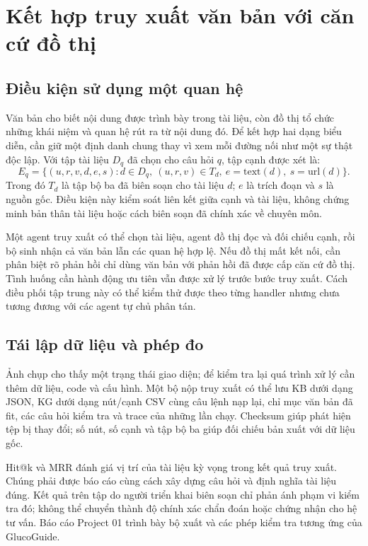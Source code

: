 \clearpage
\section{Kết hợp truy xuất văn bản với căn cứ đồ thị}
\subsection{Điều kiện sử dụng một quan hệ}
Văn bản cho biết nội dung được trình bày trong tài liệu, còn đồ thị tổ chức những khái niệm và quan hệ rút ra từ nội dung đó. Để kết hợp hai dạng biểu diễn, cần giữ một định danh chung thay vì xem mỗi đường nối như một sự thật độc lập. Với tập tài liệu $D_q$ đã chọn cho câu hỏi $q$, tập cạnh được xét là:
\[
E_q=\{(u,r,v,d,e,s):d\in D_q,\ (u,r,v)\in T_d,\ e=\mathrm{text}(d),\ s=\mathrm{url}(d)\}.
\]
Trong đó $T_d$ là tập bộ ba đã biên soạn cho tài liệu $d$; $e$ là trích đoạn và $s$ là nguồn gốc. Điều kiện này kiểm soát liên kết giữa cạnh và tài liệu, không chứng minh bản thân tài liệu hoặc cách biên soạn đã chính xác về chuyên môn.

Một agent truy xuất có thể chọn tài liệu, agent đồ thị đọc và đối chiếu cạnh, rồi bộ sinh nhận cả văn bản lẫn các quan hệ hợp lệ. Nếu đồ thị mất kết nối, cần phân biệt rõ phản hồi chỉ dùng văn bản với phản hồi đã được cấp căn cứ đồ thị. Tình huống cần hành động ưu tiên vẫn được xử lý trước bước truy xuất. Cách điều phối tập trung này có thể kiểm thử được theo từng handler nhưng chưa tương đương với các agent tự chủ phân tán.

\subsection{Tái lập dữ liệu và phép đo}
Ảnh chụp cho thấy một trạng thái giao diện; để kiểm tra lại quá trình xử lý cần thêm dữ liệu, code và cấu hình. Một bộ nộp truy xuất có thể lưu KB dưới dạng JSON, KG dưới dạng nút/cạnh CSV cùng câu lệnh nạp lại, chỉ mục văn bản đã fit, các câu hỏi kiểm tra và trace của những lần chạy. Checksum giúp phát hiện tệp bị thay đổi; số nút, số cạnh và tập bộ ba giúp đối chiếu bản xuất với dữ liệu gốc.

Hit@k và MRR đánh giá vị trí của tài liệu kỳ vọng trong kết quả truy xuất. Chúng phải được báo cáo cùng cách xây dựng câu hỏi và định nghĩa tài liệu đúng. Kết quả trên tập do người triển khai biên soạn chỉ phản ánh phạm vi kiểm tra đó; không thể chuyển thành độ chính xác chẩn đoán hoặc chứng nhận cho hệ tư vấn. Báo cáo Project 01 trình bày bộ xuất và các phép kiểm tra tương ứng của GlucoGuide.
